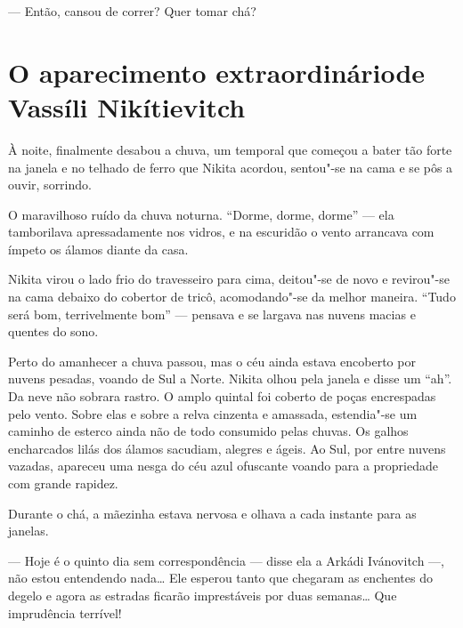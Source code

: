 
\enlargethispage{\baselineskip}

--- Então, cansou de correr? Quer tomar chá?

\chapter{O aparecimento extraordinário\break de Vassíli Nikítievitch}

À noite, finalmente desabou a chuva, um temporal que começou a bater tão
forte na janela e no telhado de ferro que Nikita acordou, sentou"-se na
cama e se pôs a ouvir, sorrindo.

O maravilhoso ruído da chuva noturna. ``Dorme, dorme, dorme'' --- ela
tamborilava apressadamente nos vidros, e na escuridão o vento arrancava
com ímpeto os álamos diante da casa.

Nikita virou o lado frio do travesseiro para cima, deitou"-se de novo e
revirou"-se na cama debaixo do cobertor de tricô, acomodando"-se da melhor
maneira. ``Tudo será bom, terrivelmente bom'' --- pensava e se largava
nas nuvens macias e quentes do sono.

Perto do amanhecer a chuva passou, mas o céu ainda estava encoberto por
nuvens pesadas, voando de Sul a Norte. Nikita olhou pela janela e disse
um ``ah''. Da neve não sobrara rastro. O amplo quintal foi coberto de
poças encrespadas pelo vento. Sobre elas e sobre a relva cinzenta e
amassada, estendia"-se um caminho de esterco ainda não de todo consumido
pelas chuvas. Os galhos encharcados lilás dos álamos sacudiam, alegres e
ágeis. Ao Sul, por entre nuvens vazadas, apareceu uma nesga do céu azul
ofuscante voando para a propriedade com grande rapidez.

Durante o chá, a mãezinha estava nervosa e olhava a cada instante para
as janelas.

--- Hoje é o quinto dia sem correspondência --- disse ela a Arkádi
Ivánovitch ---, não estou entendendo nada\ldots{} Ele esperou tanto que
chegaram as enchentes do degelo e agora as estradas ficarão imprestáveis
por duas semanas\ldots{} Que imprudência terrível!

